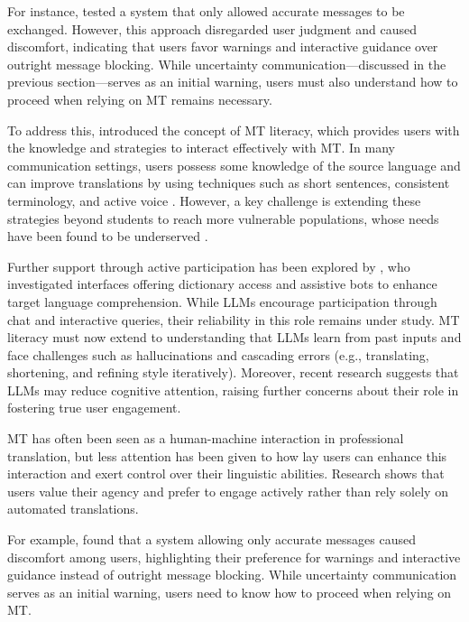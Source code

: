 For instance,  tested a system that only allowed accurate messages to be exchanged. However, this approach disregarded user judgment and caused discomfort, indicating that users favor warnings and interactive guidance over outright message blocking. While uncertainty communication—discussed in the previous section—serves as an initial warning, users must also understand how to proceed when relying on MT remains necessary.

To address this, \citet{bowker2019towards} introduced the concept of MT literacy, which provides users with the knowledge and strategies to interact effectively with MT. In many communication settings, users possess some knowledge of the source language and can improve translations by using techniques such as short sentences, consistent terminology, and active voice \citep{Bowker01092020}. However, a key challenge is extending these strategies beyond students to reach more vulnerable populations, whose needs have been found to be underserved \citep{Liebling}.

Further support through active participation has been explored by , who investigated interfaces offering dictionary access and assistive bots to enhance target language comprehension. While LLMs encourage participation through chat and interactive queries, their reliability in this role remains under study. MT literacy must now extend to understanding that LLMs learn from past inputs and face challenges such as hallucinations and cascading errors (e.g., translating, shortening, and refining style iteratively). Moreover, recent research suggests that LLMs may reduce cognitive attention, raising further concerns about their role in fostering true user engagement.


MT has often been seen as a human-machine interaction in professional translation, but less attention has been given to how lay users can enhance this interaction and exert control over their linguistic abilities. Research shows that users value their agency and prefer to engage actively rather than rely solely on automated translations.

For example,  found that a system allowing only accurate messages caused discomfort among users, highlighting their preference for warnings and interactive guidance instead of outright message blocking. While uncertainty communication serves as an initial warning, users need to know how to proceed when relying on MT.

